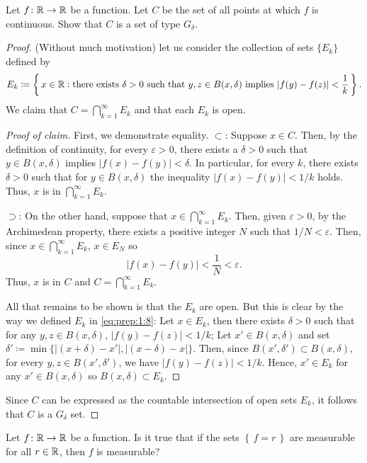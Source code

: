 \begin{problem}
Let $f\colon\mathbb{R}\to\mathbb{R}$ be a function. Let $C$ be the set of all points
at which $f$ is continuous. Show that $C$ is a set of type $G_\delta$.
\end{problem}
\begin{proof}
(Without much motivation) let us consider the collection of sets $\{E_k\}$
defined by
\begin{equation}
\label{eq:prep:1:8}
E_k\coloneq\left\{\,x\in\mathbb{R}:
\text{there exists $\delta>0$ such that $y,z\in B(x,\delta)$ implies $\left|f(y)-f(z)\right|<\frac{1}{k}$}\,\right\}.
\end{equation}
We claim that $C=\bigcap_{k=1}^\infty E_k$ and that each $E_k$ is open.
\begin{proof}[Proof of claim]
\renewcommand{\qedsymbol}{$\clubsuit$}
First, we demonstrate equality. $\subset$: Suppose $x\in C$. Then, by the
definition of continuity, for every $\varepsilon>0$, there exists a
$\delta>0$ such that $y\in B(x,\delta)$ implies $|f(x)-f(y)|<\delta$. In
particular, for every $k$, there exists $\delta>0$ such that for $y\in
B(x,\delta)$ the inequality $|f(x)-f(y)|<1/k$ holds. Thus, $x$ is in
$\bigcap_{k=1}^\infty E_k$.

$\supset$: On the other hand, suppose that $x\in\bigcap_{k=1}^\infty
E_k$. Then, given $\varepsilon>0$, by the Archimedean property, there
exists a positive integer $N$ such that $1/N<\varepsilon$. Then, since
$x\in\bigcap_{k=1}^\infty E_k$, $x\in E_N$ so
\begin{equation}
  \label{eq:prep:1:9}
|f(x)-f(y)|<\frac{1}{N}<\varepsilon.
\end{equation}
Thus, $x$ is in $C$ and $C=\bigcap_{k=1}^\infty E_k$.

All that remains to be shown is that the $E_k$ are open. But this is clear
by the way we defined $E_k$ in \eqref{eq:prep:1:8}: Let $x\in E_k$, then
there exists $\delta>0$ such that for any $y,z\in B(x,\delta)$,
$|f(y)-f(z)|<1/k$; Let $x'\in B(x,\delta)$ and set
$\delta'\coloneq\min\{|(x+\delta)-x'|,|(x-\delta)-x|\}$. Then, since
$B(x',\delta')\subset B(x,\delta)$, for every $y,z\in B(x',\delta')$, we
have $|f(y)-f(z)|<1/k$. Hence, $x'\in E_k$ for any $x'\in B(x,\delta)$
so $B(x,\delta)\subset E_k$.
\end{proof}
Since $C$ can be expressed as the countable intersection of open sets
$E_k$, it follows that $C$ is a $G_\delta$ set.
\end{proof}
\begin{problem}
Let $f\colon\mathbb{R}\to\mathbb{R}$ be a function. Is it true that if the sets
$\left\{\,f=r\,\right\}$ are measurable for all $r\in\mathbb{R}$, then $f$ is
measurable?
\end{problem}
